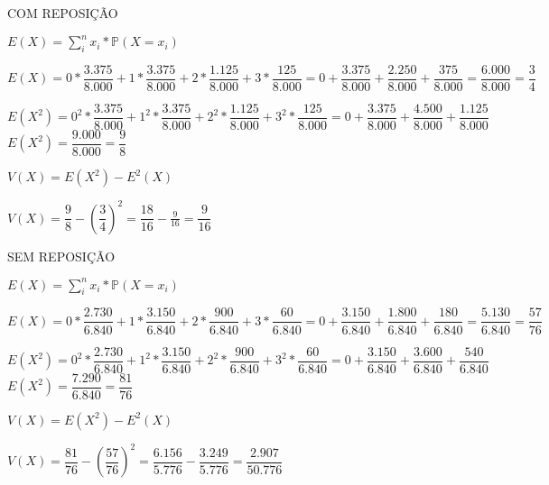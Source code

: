 \documentclass[12pt,a4paper]{article}
\begin{document}
\vspace{0.25cm}
COM REPOSIÇÃO
\begin{center}
	\vspace{0.25cm}
	$E(X) = \sum_{i}^{n} x_{i}*\mathbb{P}(X = x_{i})$
	
	\vspace{1cm}
	$E(X) = 0 * \dfrac{3.375}{8.000}+1 * \dfrac{3.375}{8.000}+2 * \dfrac{1.125}{8.000} + 3*\dfrac{125}{8.000}= 0 + \dfrac{3.375}{8.000} + \dfrac{2.250}{8.000} + \dfrac{375}{8.000} = \dfrac{6.000}{8.000} = \dfrac{3}{4}$
	
	\vspace{0.5cm}
	$E(X^{2}) = 0^{2} * \dfrac{3.375}{8.000}+1^{2} * \dfrac{3.375}{8.000}+2^{2} * \dfrac{1.125}{8.000} + 3^{2} * \dfrac{125}{8.000} = 0 + \dfrac{3.375}{8.000} + \dfrac{4.500}{8.000} + \dfrac{1.125}{8.000}$
	\vspace{0.25cm}\\ 
	$E(X^{2}) = \dfrac{9.000}{8.000} = \dfrac{9}{8}$
	
	\vspace{1cm}
	$V(X) = E(X^{2}) - E^{2}(X)$
	
	\vspace{1cm}
	$V(X) = \dfrac{9}{8}-\left(\dfrac{3}{4}\right)^{2} = \dfrac{18}{16}-\frac{9}{16}=\dfrac{9}{16}$
\end{center}

\vspace{1cm}
SEM REPOSIÇÃO
\begin{center}
	\vspace{0.25cm}
	$E(X) = \sum_{i}^{n} x_{i}*\mathbb{P}(X = x_{i})$
	
	\vspace{1cm}
	$E(X) = 0*\dfrac{2.730}{6.840}+1*\dfrac{3.150}{6.840}+2*\dfrac{900}{6.840} + 3*\dfrac{60}{6.840} = 0 + \dfrac{3.150}{6.840} + \dfrac{1.800}{6.840} + \dfrac{180}{6.840} = \dfrac{5.130}{6.840} = \dfrac{57}{76}$
	
	\vspace{1cm}
	$E(X^{2}) = 0^{2}*\dfrac{2.730}{6.840}+1^{2}*\dfrac{3.150}{6.840}+2^{2}*\dfrac{900}{6.840} + 3^{2}*\dfrac{60}{6.840} = 0 + \dfrac{3.150}{6.840} + \dfrac{3.600}{6.840} + \dfrac{540}{6.840}$
	\vspace{0.25cm}\\
	$E(X^{2}) = \dfrac{7.290}{6.840} = \dfrac{81}{76}$
	
	\vspace{1cm}
	$V(X) = E(X^{2}) - E^{2}(X)$
	
	\vspace{1cm}
	$V(X) = \dfrac{81}{76}-(\dfrac{57}{76})^{2} = \dfrac{6.156}{5.776}-\dfrac{3.249}{5.776}=\dfrac{2.907}{50.776}$
\end{center}
\end{document}
